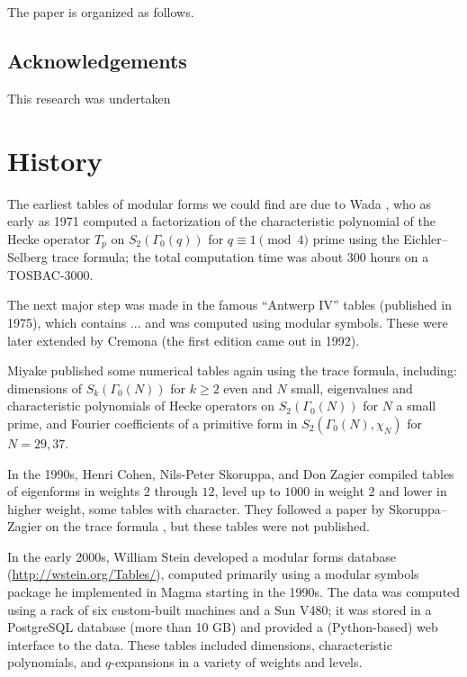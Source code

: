 \documentclass[11pt]{amsart}
\numberwithin{equation}{subsection}
\theoremstyle{plain}
\theoremstyle{definition}
\begin{document}
The paper is organized as follows.  

\subsection{Acknowledgements}

This research was undertaken 

\section{History} \label{sec:history}

The earliest tables of modular forms we could find are due to Wada \cite{Wada1,Wada2}, who as early as 1971 computed a factorization of the characteristic polynomial of the Hecke operator $T_p$ on $S_2(\Gamma_0(q))$ for $q \equiv 1 \pmod{4}$ prime using the Eichler--Selberg trace formula; the total computation time was about 300 hours on a TOSBAC-3000.  

The next major step was made in the famous ``Antwerp IV'' tables (published in 1975), which contains ...  and was computed using modular symbols.  These were later extended by Cremona \cite{Cremona:mec} (the first edition came out in 1992).

Miyake \cite{Miyake} published some numerical tables again using the trace formula, including: dimensions of $S_k(\Gamma_0(N))$ for $k \geq 2$ even and $N$ small, eigenvalues and characteristic polynomials of Hecke operators on $S_2(\Gamma_0(N))$ for $N$ a small prime, and Fourier coefficients of a primitive form in $S_2(\Gamma_0(N),\chi_N)$ for $N=29,37$.

In the 1990s, Henri Cohen, Nils-Peter Skoruppa, and Don Zagier compiled tables of eigenforms in weights $2$ through $12$, level up to $1000$ in weight $2$ and lower in higher weight, some tables with character.  They followed a paper by Skoruppa--Zagier on the trace formula \cite{SkorrupaZagier}, but these tables were not published.  

In the early 2000s, William Stein developed a modular forms database (\href{http://wstein.org/Tables/}{http://wstein.org/Tables/}), computed primarily using a modular symbols package \cite{Stein} he implemented in \textsf{Magma} \cite{Magma} starting in the 1990s.  The data was computed using a rack of six custom-built machines and a Sun V480; it was stored in a PostgreSQL database (more than 10 GB) and provided a (Python-based) web interface to the data.  These tables included dimensions, characteristic polynomials, and $q$-expansions in a variety of weights and levels.  
\end{document}

